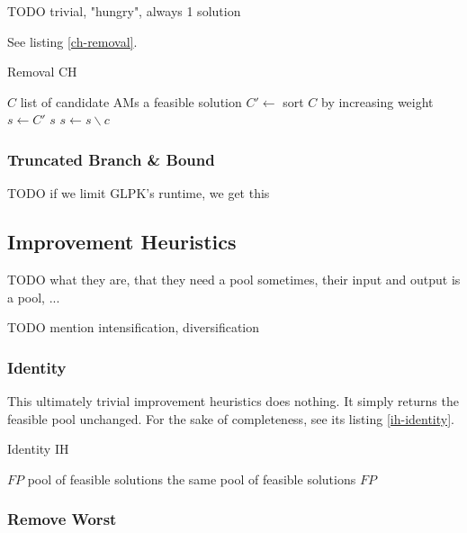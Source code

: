 \documentclass[a4paper,12pt,oneside]{report}
\begin{document}
TODO trivial, "hungry", always 1 solution

See listing \ref{ch-removal}.

\begin{algorithm}
\caption{Removal CH}
\label{ch-removal}
\begin{algorithmic}
\REQUIRE $C$ list of candidate AMs
\ENSURE a feasible solution
\STATE $C' \gets $ sort $C$ by increasing weight
\STATE $s \gets C'$
    \RETURN $s$
  \ENDIF
  \STATE $s \gets s \backslash c$
\ENDFOR
\end{algorithmic}
\end{algorithm}

\subsubsection{Truncated Branch \& Bound}

TODO if we limit GLPK's runtime, we get this 

\subsection{Improvement Heuristics}


TODO what they are, that they need a pool sometimes, their input and output is a pool, ...

TODO mention intensification, diversification

\subsubsection{Identity}

This ultimately trivial improvement heuristics does nothing. It simply returns the feasible pool unchanged. For the sake of completeness, see its listing \ref{ih-identity}.

\begin{algorithm}
\caption{Identity IH}
\label{ih-identity}
\begin{algorithmic}
\REQUIRE $FP$ pool of feasible solutions
\ENSURE the same pool of feasible solutions
\RETURN $FP$
\end{algorithmic}
\end{algorithm}

\subsubsection{Remove Worst}
\end{document}
